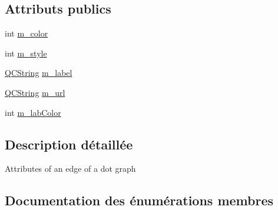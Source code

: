 \subsection*{Attributs publics}
\begin{DoxyCompactItemize}
\item 
int \hyperlink{struct_edge_info_a67f74484abac64da6f84291550232430}{m\+\_\+color}
\item 
int \hyperlink{struct_edge_info_a9cd01dc1ff370a261f5850a1fa5812f9}{m\+\_\+style}
\item 
\hyperlink{class_q_c_string}{Q\+C\+String} \hyperlink{struct_edge_info_ab735a4292f619dc43efb887bc4b42119}{m\+\_\+label}
\item 
\hyperlink{class_q_c_string}{Q\+C\+String} \hyperlink{struct_edge_info_a0f0c4b78066f2ed4ed4e453ad8fdf428}{m\+\_\+url}
\item 
int \hyperlink{struct_edge_info_a1074753351376c3d894e3a1777a643d1}{m\+\_\+lab\+Color}
\end{DoxyCompactItemize}


\subsection{Description détaillée}
Attributes of an edge of a dot graph 

\subsection{Documentation des énumérations membres}
\hypertarget{struct_edge_info_afd9f10f4693123d11e52bb1127f23228}{}
